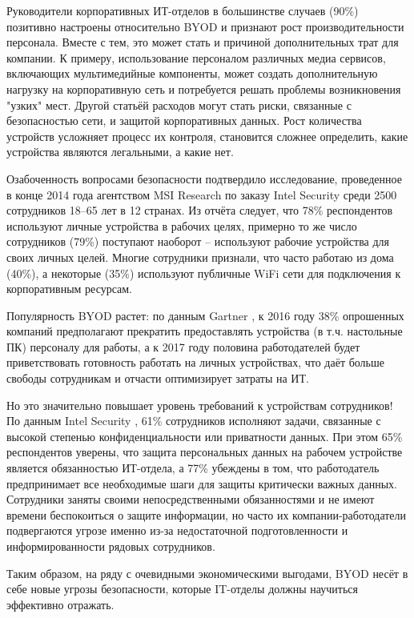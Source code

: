 \documentclass[a4paper, 12pt]{article}		%
\begin{document}
Руководители корпоративных ИТ-отделов в большинстве случаев (90\%) позитивно настроены относительно BYOD и признают рост производительности персонала. Вместе с тем, это может стать и причиной дополнительных трат для компании. К примеру, использование персоналом различных медиа сервисов, включающих мультимедийные компоненты, может создать дополнительную нагрузку на корпоративную сеть и потребуется решать проблемы возникновения "узких" мест. Другой статьёй расходов могут стать риски, связанные с безопасностью сети, и защитой корпоративных данных. Рост количества устройств усложняет процесс их контроля, становится сложнее определить, какие устройства являются легальными, а какие нет.

Озабоченность вопросами безопасности подтвердило исследование, проведенное в конце 2014 года агентством MSI Research по заказу Intel Security среди 2500 сотрудников 18–65 лет в 12 странах. Из отчёта \cite{PCWeekPR} следует, что 78\% респондентов используют личные устройства в рабочих целях, примерно то же число сотрудников (79\%) поступают наоборот -- используют рабочие устройства для своих личных целей. Многие сотрудники признали, что часто работаю из дома (40\%), а некоторые (35\%) используют публичные WiFi сети для подключения к корпоративным ресурсам.

Популярность BYOD растет: по данным Gartner \cite{Gartner}, к 2016 году 38\% опрошенных компаний предполагают прекратить предоставлять устройства (в т.ч. настольные ПК) персоналу для работы, а к 2017 году половина работодателей будет приветствовать готовность работать на личных устройствах, что даёт больше свободы сотрудникам и отчасти оптимизирует затраты на ИТ.

Но это значительно повышает уровень требований к устройствам сотрудников! По данным Intel Security \cite{PCWeekPR}, 61\% сотрудников исполняют задачи, связанные с высокой степенью конфиденциальности или приватности данных. При этом 65\% респондентов уверены, что защита персональных данных на рабочем устройстве является обязанностью ИТ-отдела, а 77\% убеждены в том, что работодатель предпринимает все необходимые шаги для защиты критически важных данных. Сотрудники заняты своими непосредственными обязанностями и не имеют времени беспокоиться о защите информации, но часто их компании-работодатели подвергаются угрозе именно из-за недостаточной подготовленности и информированности рядовых сотрудников.

Таким образом, на ряду с очевидными экономическими выгодами, BYOD несёт в себе новые угрозы безопасности, которые IT-отделы должны научиться эффективно отражать.
\end{document}
